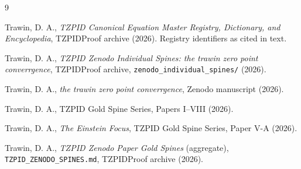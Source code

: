 \documentclass[11pt]{article}
\theoremstyle{remark}
\begin{document}
\begin{thebibliography}{9}

 Trawin, D. A., \emph{TZPID Canonical Equation Master Registry, Dictionary, and Encyclopedia}, TZPIDProof archive (2026). Registry identifiers as cited in text.

 Trawin, D. A., \emph{TZPID Zenodo Individual Spines: the trawin zero point converrgence}, TZPIDProof archive, \texttt{zenodo\_individual\_spines/} (2026).

 Trawin, D. A., \emph{the trawin zero point converrgence}, Zenodo manuscript (2026).

 Trawin, D. A., TZPID Gold Spine Series, Papers I--VIII (2026).

 Trawin, D. A., \emph{The Einstein Focus}, TZPID Gold Spine Series, Paper V-A (2026).

 Trawin, D. A., \emph{TZPID Zenodo Paper Gold Spines} (aggregate), \texttt{TZPID\_ZENODO\_SPINES.md}, TZPIDProof archive (2026).

\end{thebibliography}
\end{document}
